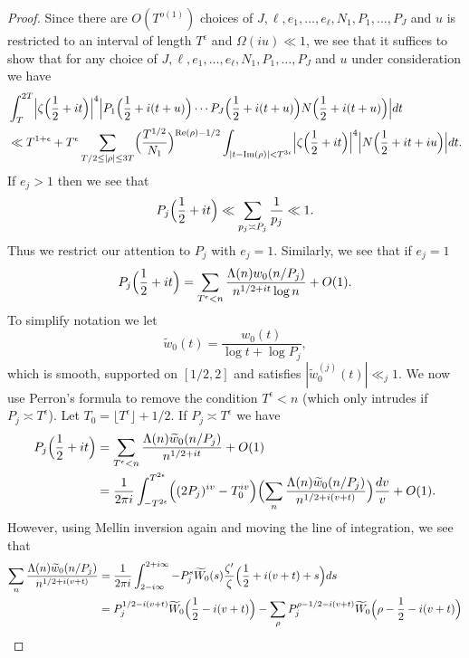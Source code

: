 \documentclass[12pt]{amsart}
\theoremstyle{plain}
\theoremstyle{definition}
\theoremstyle{remark}
\begin{document}
\begin{proof}
Since there are $O(T^{o(1)})$ choices of $J,\ell,e_1,\dots,e_\ell,N_1,P_1,\dots,P_J$ and $u$ is restricted to an interval of length $T^\epsilon$ and $\Omega(iu)\ll 1$, we see that it suffices to show that for any choice of $J,\ell,e_1,\dots,e_\ell,N_1,P_1,\dots,P_J$ and $u$ under consideration we have
\begin{align*}
&\int_T^{2T}\Bigl|\zeta\Bigl(\frac{1}{2}+it\Bigr)\Bigr|^4\Bigl|P_1\Bigl(\frac{1}{2}+i(t+u)\Bigr)\cdots P_J\Bigl(\frac{1}{2}+i(t+u)\Bigr)N\Bigl(\frac{1}{2}+i(t+u)\Bigr)\Bigr| dt\\
&\ll 
T^{1+\epsilon}+T^{\epsilon}\sum_{T/2\le |\rho|\le 3T}\Bigl(\frac{T^{1/2}}{N_1}\Bigr)^{\text{Re}(\rho)-1/2}\int_{|t-\text{Im}(\rho)|<T^{3\epsilon}}\Bigl|\zeta\Bigl(\frac{1}{2}+it\Bigr)\Bigr|^4 \Bigl|N\Bigl(\frac{1}{2}+it+iu\Bigr)\Bigr| dt.
\end{align*}
If $e_j>1$ then we see that
\[
P_j\Bigl(\frac{1}{2}+it\Bigr)\ll \sum_{p_j \asymp P_j}\frac{1}{p_j}\ll 1.
\]
Thus we restrict our attention to $P_j$ with $e_j=1$. Similarly, we see that if $e_j=1$
\[
P_j\Bigl(\frac{1}{2}+it\Bigr)=\sum_{T^\epsilon<n}\frac{\Lambda(n)w_0(n/P_j)}{n^{1/2+it}\log{n}}+O(1).
\]
To simplify notation we let
\[
\widetilde{w}_0(t)=\frac{w_0(t)}{\log{t}+\log{P_j}},
\]
which is smooth, supported on $[1/2,2]$ and satisfies $|\widetilde{w}_0^{(j)}(t)|\ll_j 1$. We now use Perron's formula to remove the condition $T^\epsilon<n$ (which only intrudes if $P_j \asymp T^\epsilon$). Let $T_0=\lfloor T^\epsilon\rfloor+1/2$. If $P_j \asymp T^\epsilon$ we have
\begin{equation}\label{eq:Pj}
\begin{split}
P_j\Bigl(\frac{1}{2}+it\Bigr)&=\sum_{T^{\epsilon}<n}\frac{\Lambda(n)\widetilde{w}_0(n/P_j)}{n^{1/2+it}}+O(1)\\
&=\frac{1}{2\pi i}\int_{-T^{2\epsilon}}^{T^{2\epsilon}}\Bigl((2P_j)^{iv}-T_0^{iv}\Bigr)\Bigl(\sum_{n}\frac{\Lambda(n)\widetilde{w}_0(n/P_j)}{n^{1/2+i(v+t)}}\Bigr)\frac{dv}{v}+O(1).
\end{split}
\end{equation}
However, using Mellin inversion again and moving the line of integration, we see that
\begin{align*}
\sum_{n}\frac{\Lambda(n)\widetilde{w}_0(n/P_j)}{n^{1/2+i(v+t)}}&=\frac{1}{2\pi i}\int_{2-i\infty}^{2+i\infty} -P_j^{s}\widetilde{W}_0(s)\frac{\zeta'}{\zeta}\Bigl(\frac{1}{2}+i(v+t)+s\Bigr)ds\\
&=P_j^{1/2-i(v+t)}\widetilde{W}_0\Bigl(\frac{1}{2}-i(v+t)\Bigr)-\sum_{\rho}P_j^{\rho-1/2-i(v+t)}\widetilde{W}_0\Bigl(\rho-\frac{1}{2}-i(v+t)\Bigr)\\

\end{align*}
\end{proof}
\end{document}

